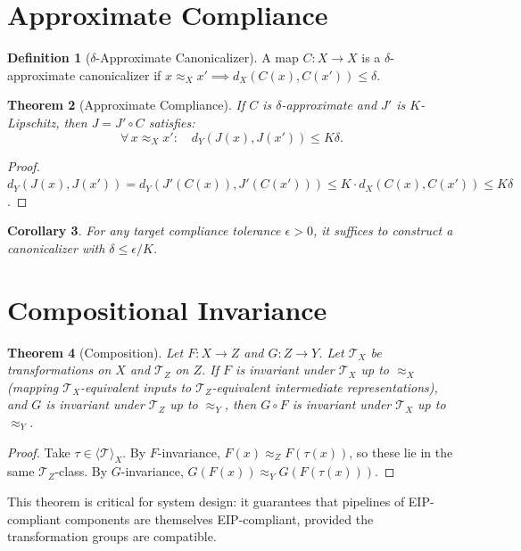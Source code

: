 \documentclass[12pt,letterpaper]{article}
\newtheorem{theorem}{Theorem}[section]
\newtheorem{corollary}[theorem]{Corollary}
\theoremstyle{definition}
\newtheorem{definition}[theorem]{Definition}
\theoremstyle{plain}
\newcommand{\calT}{\mathcal{T}}
\newcommand{\genT}{\langle \mathcal{T} \rangle}
\newcommand{\equivX}{\approx_X}
\newcommand{\equivY}{\approx_Y}
\begin{document}
\section{Approximate Compliance}
\label{sec:thm-approx}

\begin{definition}[$\delta$-Approximate Canonicalizer]
A map $C: X \to X$ is a $\delta$-approximate canonicalizer if $x \equivX x' \implies d_X(C(x), C(x')) \leq \delta$.
\end{definition}

\begin{theorem}[Approximate Compliance]
\label{thm:approx-compliance}
If $C$ is $\delta$-approximate and $J'$ is $K$-Lipschitz, then $J = J' \circ C$ satisfies:
\[
\forall\, x \equivX x': \quad d_Y(J(x), J(x')) \leq K\delta.
\]
\end{theorem}

\begin{proof}
$d_Y(J(x), J(x')) = d_Y(J'(C(x)), J'(C(x'))) \leq K \cdot d_X(C(x), C(x')) \leq K\delta$.
\end{proof}

\begin{corollary}
For any target compliance tolerance $\epsilon > 0$, it suffices to construct a canonicalizer with $\delta \leq \epsilon / K$.
\end{corollary}


\section{Compositional Invariance}
\label{sec:thm-composition}

\begin{theorem}[Composition]
\label{thm:composition}
Let $F: X \to Z$ and $G: Z \to Y$. Let $\calT_X$ be transformations on $X$ and $\calT_Z$ on $Z$. If $F$ is invariant under $\calT_X$ up to $\equivX$ (mapping $\calT_X$-equivalent inputs to $\calT_Z$-equivalent intermediate representations), and $G$ is invariant under $\calT_Z$ up to $\equivY$, then $G \circ F$ is invariant under $\calT_X$ up to $\equivY$.
\end{theorem}

\begin{proof}
Take $\tau \in \genT_X$. By $F$-invariance, $F(x) \approx_Z F(\tau(x))$, so these lie in the same $\calT_Z$-class. By $G$-invariance, $G(F(x)) \equivY G(F(\tau(x)))$.
\end{proof}

This theorem is critical for system design: it guarantees that pipelines of EIP-compliant components are themselves EIP-compliant, provided the transformation groups are compatible.
\end{document}
